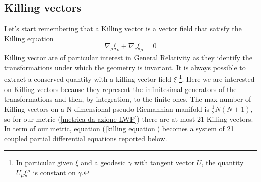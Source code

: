 \subsection{Killing vectors}
Let's start remembering that a Killing vector is a vector field that satisfy the Killing equation
\begin{equation}
    \nabla_{\mu}\xi_{\nu} + \nabla_{\nu}\xi_{\mu} = 0
    \label{killing equation}
\end{equation}
Killing vector are of particular interest in General Relativity as they identify the transformations under which the geometry is invariant. It is always possible to extract a conserved quantity with a killing vector field $\xi$ \footnote{In particular given $\xi$ and a geodesic $\gamma$ with tangent vector $U$, the quantity $U_{\mu}\xi^{\mu}$ is constant on $\gamma$.}. Here we are interested on Killing vectors because they represent the infinitesimal generators of the transformations and then, by integration, to the finite ones. The max number of Killing vectors on a N dimensional pseudo-Riemannian manifold is $\frac{1}{2}N(N+1)$, so for our metric (\ref{metrica da azione LWP}) there are at most 21 Killing vectors. In term of our metric, equation (\ref{killing equation}) becomes a system of 21 coupled partial differential equations reported below.
